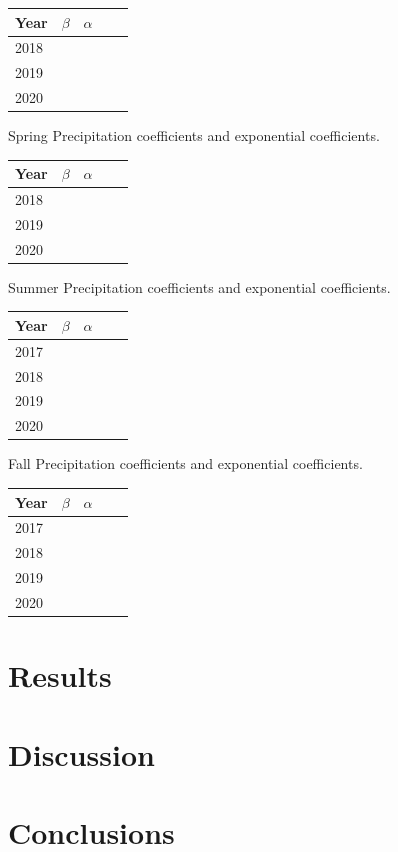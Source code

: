\documentclass[11pt]{report}
\begin{document}
\begin{center}
	\begin{tabular}{l*{3}{c}r}
		Year      & $\beta $ & $\alpha$  \\
		\hline
		2018      &            &      \\
		2019      &            &    \\
		2020      &             &      \\
	\end{tabular}
\end{center}
Spring Precipitation coefficients and exponential coefficients.\\ 
\begin{center}
	\begin{tabular}{l*{3}{c}r}
		Year      & $\beta $ & $\alpha$  \\
		\hline
		2018      &            &      \\
		2019      &            &    \\
		2020      &             &      \\
	\end{tabular}
\end{center}
Summer Precipitation coefficients and exponential coefficients. \\
\begin{center}
	\begin{tabular}{l*{3}{c}r}
		Year      & $\beta $ & $\alpha$  \\
		\hline
		2017      &            &     \\
		2018      &             &     \\
		2019      &            &    \\
		2020      &             &      \\
	\end{tabular}
\end{center}
Fall Precipitation coefficients and exponential coefficients. \\
\begin{center}
	\begin{tabular}{l*{3}{c}r}
		Year      & $\beta $ & $\alpha$  \\
		\hline
		2017      &            &     \\
		2018      &             &     \\
		2019      &            &    \\
		2020      &             &      \\
	\end{tabular}
\end{center}
\section{Results \label{sec:results}}


\section{Discussion \label{sec:discussion}}


\section{Conclusions \label{sec:conclusions}}


\small
\renewcommand{\bibsep}{0em}

\renewcommand{\bibname}{References}


\end{document}
